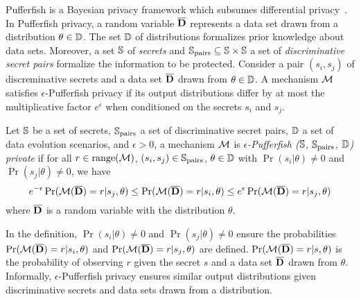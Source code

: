 Pufferfish is a Bayesian privacy framework which subsumes differential
privacy~\cite{KM:14:PFMPD}. In Pufferfish privacy, a random variable
$\overline{\mathbf{D}}$ represents a data set drawn from a distribution $\theta \in
\mathbb{D}$. The set $\mathbb{D}$ of distributions formalizes prior knowledge
about data sets. Moreover, a set $\mathbb{S}$ of \emph{secrets} and
$\mathbb{S}_{\textmd{pairs}} \subseteq \mathbb{S} \times \mathbb{S}$ a set of
\emph{discriminative secret pairs} formalize the information to be
protected. Consider a pair $(s_i, s_j)$ of discreminative secrets and
a data set $\overline{\mathbf{D}}$ drawn from $\theta \in \mathbb{D}$. A mechanism $\mathcal{M}$
satisfies $\epsilon$-Pufferfish privacy if its output distributions
differ by at most the multiplicative factor $e^{\epsilon}$ when
conditioned on the secrets $s_i$ and $s_j$.

\begin{definition}
  Let $\mathbb{S}$ be a set of secrets, $\mathbb{S}_{\textmd{pairs}}$ a set of
  discriminative secret pairs, $\mathbb{D}$ a set of data evolution
  scenarios, and $\epsilon > 0$, a mechanism $\mathcal{M}$ is
  \emph{$\epsilon$-Pufferfish ($\mathbb{S}$, $\mathbb{S}_{\textmd{pairs}}$,
    $\mathbb{D}$) private} if for all $r \in \textmd{range}(\mathcal{M})$, $(s_i, s_j) \in
    \mathbb{S}_{\textmd{pairs}}$, $\theta \in \mathbb{D}$ with $\Pr (s_i |
    \theta) \neq 0$ and $\Pr (s_j | \theta) \neq 0$, we have
    \[
      e^{-\epsilon} \Pr (\mathcal{M} (\overline{\mathbf{D}}) = r | s_j, \theta) \leq
      \Pr (\mathcal{M} (\overline{\mathbf{D}}) = r | s_i, \theta) \leq
      e^\epsilon \Pr (\mathcal{M} (\overline{\mathbf{D}}) = r | s_j, \theta)
    \]
    where $\overline{\mathbf{D}}$ is a random variable with the distribution $\theta$.
\end{definition}

In the definition, $\Pr (s_i | \theta) \neq 0$ and $\Pr (s_j | \theta)
\neq 0$ ensure the probabilities $\Pr (\mathcal{M} (\overline{\mathbf{D}}) = r | s_i, \theta)$
and $\Pr (\mathcal{M} (\overline{\mathbf{D}}) = r | s_j, \theta)$ are defined. 
$\Pr (\mathcal{M} (\overline{\mathbf{D}}) = r | s, \theta)$ is the probability of observing
$r$ given the secret $s$ and a data set $\overline{\mathbf{D}}$ drawn from
$\theta$. Informally, $\epsilon$-Pufferfish privacy ensures similar
output distributions given discriminative secrets and data sets drawn
from a distribution. 
  